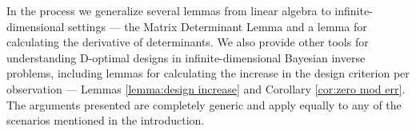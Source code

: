 \documentclass{amsart}
\numberwithin{equation}{section}
\begin{document}
In the process we generalize several lemmas from linear algebra to
infinite-dimensional settings --- the Matrix Determinant Lemma and a
lemma for calculating the derivative of determinants. We also provide
other tools for understanding D-optimal designs in
infinite-dimensional Bayesian inverse problems, including lemmas for
calculating the increase in the design criterion per observation ---
Lemmas \ref{lemma:design increase} and Corollary \ref{cor:zero mod
  err}. %
The arguments presented are completely generic and apply equally to
any of the scenarios mentioned in the introduction.

\end{document}
